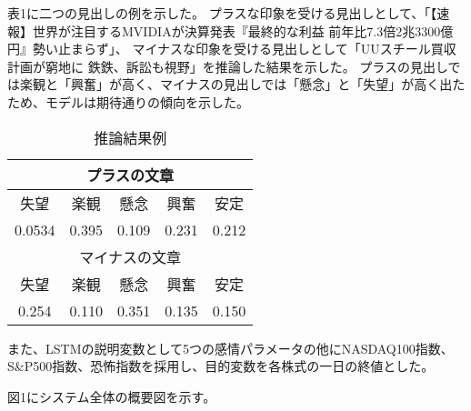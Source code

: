 \documentclass[a4paper, 10pt]{ltjsarticle}
\begin{document}

表1に二つの見出しの例を示した。
プラスな印象を受ける見出しとして、「【速報】世界が注目するMVIDIAが決算発表『最終的な利益 前年比7.3倍2兆3300億円』勢い止まらず」、
マイナスな印象を受ける見出しとして「UUスチール買収計画が窮地に 鉄鉄、訴訟も視野」を推論した結果を示した。
プラスの見出しでは楽観と「興奮」が高く、マイナスの見出しでは「懸念」と「失望」が高く出たため、モデルは期待通りの傾向を示した。




\begin{table}[h]
    \centering
    \caption{推論結果例}
    \vspace{-0.5em}
    \begin{tabular}{|c|c|c|c|c|}\hline
        \multicolumn{5}{|c|}{プラスの文章} \\ \hline
        失望 & 楽観 & 懸念 & 興奮 & 安定 \\ \hline
        0.0534 & 0.395 & 0.109 & 0.231 & 0.212 \\ \hline
        \multicolumn{5}{|c|}{マイナスの文章} \\ \hline
        失望 & 楽観 & 懸念 & 興奮 & 安定 \\ \hline
        0.254 & 0.110 & 0.351 & 0.135 & 0.150 \\ \hline
    \end{tabular}

\end{table}

また、LSTMの説明変数として5つの感情パラメータの他にNASDAQ100指数、S\&P500指数、恐怖指数を採用し、目的変数を各株式の一日の終値とした。

図1にシステム全体の概要図を示す。

\end{document}
